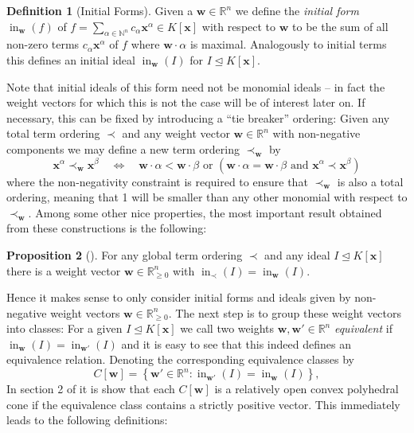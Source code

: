 \documentclass[
  paper=a4,
  titlepage,
  bibliography=totoc,
  listof=totoc,
  pagesize=pdftex
]{scrartcl}
\numberwithin{figure}{section}
\numberwithin{equation}{section}
\numberwithin{table}{section}
\newcommand*\setR{\mathds{R}}
\newcommand*\setN{\mathds{N}}
\let\vec\mathbf
\let\idealof\trianglelefteq
\DeclareMathOperator{\initial}{in}
\theoremstyle{definition}
\newtheorem{definition}{Definition}
\newtheorem{proposition}[definition]{Proposition}
\numberwithin{definition}{section}
\begin{document}
\begin{definition}[Initial Forms]
  \label{def:initFormG}
  Given a $\vec w \in \setR^n$ we define the \emph{initial form} $\initial_{\vec w}(f)$ of
  $f = \sum_{\alpha\in\setN^n} c_\alpha \vec x^\alpha \in K[\vec x]$ with respect to $\vec
  w$ to be the sum of all non-zero terms $c_\alpha \vec x^\alpha$ of $f$ where $\vec
  w\cdot \alpha$ is maximal. Analogously to initial terms this defines an initial ideal
  $\initial_{\vec w}(I)$ for $I \idealof K[\vec x]$.
\end{definition}

Note that initial ideals of this form need not be monomial ideals -- in fact the weight
vectors for which this is not the case will be of interest later on. If necessary, this
can be fixed by introducing a \enquote{tie breaker} ordering: Given any total term
ordering $\prec$ and any weight vector $\vec w\in\setR^n$ with non-negative components we
may define a new term ordering $\prec_{\vec w}$ by
\[
  \vec x^\alpha \prec_{\vec w} \vec x^\beta
  \quad\iff\quad
  \vec w \cdot \alpha < \vec w\cdot \beta
  \text{ or }
  \left(
    \vec w \cdot \alpha = \vec w\cdot \beta
    \text{ and }
    \vec x^\alpha \prec \vec x^\beta
  \right)
\]
where the non-negativity constraint is required to ensure that $\prec_{\vec w}$ is also a
total ordering, meaning that 1 will be smaller than any other monomial with respect to
$\prec_{\vec w}$. Among some other nice properties, the most important result obtained
from these constructions is the following:

\begin{proposition}[{\cite[Proposition~1.11]{SturmGBCP}}]
  \label{prp:init}
  For any global term ordering $\prec$ and any ideal $I \idealof K[\vec x]$ there is a
  weight vector $\vec w \in \setR^n_{\geq0}$ with $\initial_\prec(I) = \initial_{\vec
  w}(I)$.
\end{proposition}

Hence it makes sense to only consider initial forms and ideals given by non-negative
weight vectors $\vec w \in \setR^n_{\geq0}$. The next step is to group these weight
vectors into classes: For a given $I \idealof K[\vec x]$ we call two weights $\vec w, \vec
w' \in \setR^n$ \emph{equivalent} if $\initial_{\vec w}(I) = \initial_{\vec w'}(I)$ and it
is easy to see that this indeed defines an equivalence relation. Denoting the
corresponding equivalence classes by
\[
  C[\vec w] = \left\{
    \vec w' \in \setR^n : \initial_{\vec w'}(I) = \initial_{\vec w}(I)
  \right\},
\]
In section 2 of \cite{compGrobFan} it is show that each $C[\vec w]$ is a relatively open
convex polyhedral cone if the equivalence class contains a strictly positive vector. This
immediately leads to the following definitions:
\end{document}
